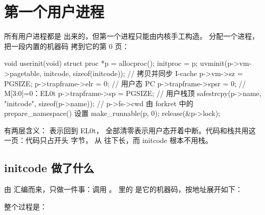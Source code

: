 \section{第一个用户进程}

所有用户进程都是  出来的，但第一个进程只能由内核手工构造。 分配一个进程，把一段内置的机器码  拷到它的第 0 页：

\begin{ccode}
void userinit(void) {
  struct proc *p = allocproc();
  initproc = p;
  uvminit(p->vm->pagetable, initcode, sizeof(initcode));  // 拷贝并同步 I-cache
  p->vm->sz = PGSIZE;
  p->trapframe->elr  = 0;          // 用户态 PC
  p->trapframe->spsr = 0;          // M[3:0]=0：EL0t
  p->trapframe->sp   = PGSIZE;     // 用户栈顶
  safestrcpy(p->name, "initcode", sizeof(p->name));
  // p->fs->cwd 由 forkret 中的 prepare_namespace() 设置
  make_runnable(p, 0);
  release(&p->lock);
}
\end{ccode}

 有两层含义： 表示回到 EL0t， 全部清零表示用户态开着中断。代码和栈共用这一页：代码只占开头  字节， 从  往下长，而 initcode 根本不用栈。

\subsection{initcode 做了什么}

 由  汇编而来，只做一件事：调用 。 里的  是它的机器码，按地址展开如下：


整个过程是：

